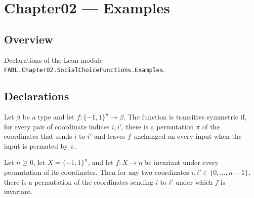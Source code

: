 \chapter{Chapter02 — Examples}
\section{Overview}

Declarations of the Lean module \texttt{FABL.Chapter02.SocialChoiceFunctions.Examples}.

\section{Declarations}

\begin{definition}
\label{FABL.IsTransitiveSymmetric}
\leanok
{}
Let $\beta$ be a type and let $f\colon\{-1,1\}^n\to\beta$. The function is transitive
symmetric if, for every pair of coordinate indices $i,i'$, there is a permutation $\pi$
of the coordinates that sends $i$ to $i'$ and leaves $f$ unchanged on every input when
the input is permuted by $\pi$.
\end{definition}

\begin{theorem}
\label{FABL.IsSymmetric.isTransitiveSymmetric}
\leanok
{}
Let $n\ge 0$, let $X=\{-1,1\}^n$, and let $f:X\to\eta$ be invariant under every
permutation of its coordinates. Then for any two coordinates $i,i'\in\{0,\ldots,n-1\}$,
there is a permutation of the coordinates sending $i$ to $i'$ under which $f$ is invariant.
\end{theorem}

